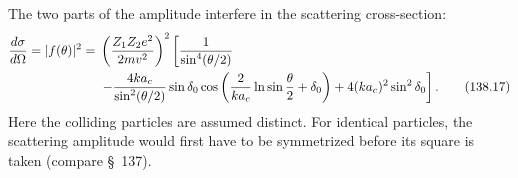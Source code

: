The two parts of the amplitude interfere in the scattering cross-section:
\begin{align}
 \frac{d\sigma}{d\Omega}=|f(\theta)|^2
 ={}&\left(\frac{Z_1Z_2e^2}{2mv^2}\right)^2
 \left[\frac1{\sin^4(\theta/2)}\right.\notag\\
 &\left.-\frac{4ka_c}{\sin^2(\theta/2)}\sin\delta_0
 \cos\left(\frac2{ka_c}\ln\sin\frac\theta2+\delta_0\right)
 +4(ka_c)^2\sin^2\delta_0\right].
 \tag{138.17}
\end{align}
Here the colliding particles are assumed distinct. For identical particles,
the scattering amplitude would first have to be symmetrized before its square
is taken (compare \S~137).
